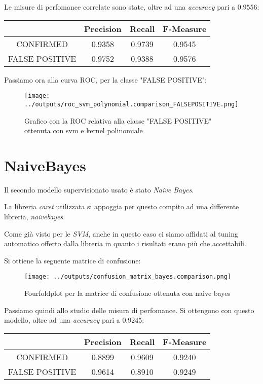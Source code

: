 Le misure di perfomance correlate sono state, oltre ad una \textit{accuracy} 
pari a $0.9556$:
\begin{center}
    \begin{tabular}{| c | c c c |} 
    \hline  
    & Precision & Recall & F-Measure \\ [0.5ex] 
    \hline\hline
    CONFIRMED & 0.9358 & 0.9739 & 0.9545 \\ 
    \hline
    FALSE POSITIVE  & 0.9752 & 0.9388 & 0.9576 \\ 
    \hline
    \end{tabular}
\end{center}

Passiamo ora alla curva ROC, per la classe "FALSE POSITIVE":
\begin{figure}[H]
    \centering
    \texttt{[image: ../outputs/roc\_svm\_polynomial.comparison\_FALSEPOSITIVE.png]}
    \caption{Grafico con la ROC relativa alla classe "FALSE POSITIVE" ottenuta con 
    svm e kernel polinomiale}
\end{figure}

\section{NaiveBayes}
Il secondo modello supervisionato usato è stato \textit{Naive Bayes}.

La libreria \textit{caret} utilizzata si appoggia per questo compito ad una 
differente libreria, \textit{naivebayes}.

Come già visto per le \textit{SVM}, anche in questo caso ci siamo affidati al tuning 
automatico offerto dalla libreria in quanto i risultati erano più che 
accettabili.

Si ottiene la seguente matrice di confusione:
\begin{figure}[H]
    \centering
    \texttt{[image: ../outputs/confusion\_matrix\_bayes.comparison.png]}
    \caption{Fourfoldplot per la matrice di confusione ottenuta con naive bayes}
\end{figure}
Passiamo quindi allo studio delle misura di perfomance.
Si ottengono con questo modello, oltre ad una \textit{accuracy} pari a $0.9245$:
\begin{center}
    \begin{tabular}{| c | c c c |} 
    \hline
    & Precision & Recall & F-Measure \\ [0.5ex] 
    \hline\hline
    CONFIRMED & 0.8899 & 0.9609 & 0.9240 \\ 
    \hline
    FALSE POSITIVE & 0.9614 & 0.8910 & 0.9249 \\ 
    \hline
    \end{tabular}
\end{center}

